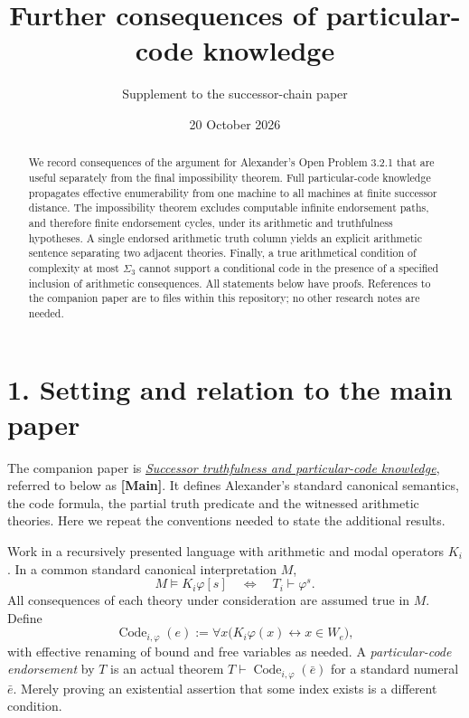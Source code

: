 \documentclass[
  11pt,
  letterpaper,
]{article}
\title{Further consequences of particular-code knowledge}
\subtitle{Supplement to the successor-chain paper}
\author{}
\date{20 October 2026}
\begin{document}
\maketitle
\begin{abstract}
We record consequences of the argument for Alexander's Open Problem
3.2.1 that are useful separately from the final impossibility theorem.
Full particular-code knowledge propagates effective enumerability from
one machine to all machines at finite successor distance. The
impossibility theorem excludes computable infinite endorsement paths,
and therefore finite endorsement cycles, under its arithmetic and
truthfulness hypotheses. A single endorsed arithmetic truth column
yields an explicit arithmetic sentence separating two adjacent theories.
Finally, a true arithmetical condition of complexity at most
\(\Sigma_3\) cannot support a conditional code in the presence of a
specified inclusion of arithmetic consequences. All statements below
have proofs. References to the companion paper are to files within this
repository; no other research notes are needed.
\end{abstract}

\section{1. Setting and relation to the main
paper}\label{setting-and-relation-to-the-main-paper}

The companion paper is
\href{../successor-knowers-3-2-1.md}{\emph{Successor truthfulness and
particular-code knowledge}}, referred to below as \textbf{{[}Main{]}}.
It defines Alexander's standard canonical semantics, the code formula,
the partial truth predicate and the witnessed arithmetic theories. Here
we repeat the conventions needed to state the additional results.

Work in a recursively presented language with arithmetic and modal
operators \(K_i\). In a common standard canonical interpretation \(M\),
\[
M\models K_i\varphi[s]
\quad\Longleftrightarrow\quad
T_i\vdash\varphi^s.
\tag{S1}
\] All consequences of each theory under consideration are assumed true
in \(M\). Define \[
\operatorname{Code}_{i,\varphi}(e)
:=\forall x\bigl(K_i\varphi(x)\leftrightarrow x\in W_e\bigr),
\tag{S2}
\] with effective renaming of bound and free variables as needed. A
\emph{particular-code endorsement} by \(T\) is an actual theorem
\(T\vdash\operatorname{Code}_{i,\varphi}(\bar e)\) for a standard
numeral \(\bar e\). Merely proving an existential assertion that some
index exists is a different condition.
\end{document}
